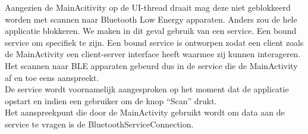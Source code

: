 Aangezien de MainAcitivity op de UI-thread draait mag deze niet geblokkeerd worden met scannen naar Bluetooth Low Energy apparaten. Anders zou de hele applicatie blokkeren. We maken in dit geval gebruik van een service. Een bound service om specifiek te zijn. Een bound service is ontworpen zodat een client zoals de MainActivity een client-server interface heeft waarmee zij kunnen interageren. Het scannen naar BLE apparaten gebeurd dus in de service die de MainActivity af en toe eens aanspreekt.\\

De service wordt voornamelijk aangesproken op het moment dat de applicatie opstart en indien een gebruiker om de knop “Scan” drukt.\\

Het aanspreekpunt die door de MainActivity gebruikt wordt om data aan de service te vragen is de BluetoothServiceConnection.

